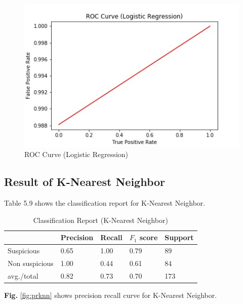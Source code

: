 \begin{figure}[h!]
    \centering
    \includegraphics[scale=0.58]{Figures/ROCL.jpg}
    \caption{ROC Curve (Logistic Regression)}
    \label{fig:rocl}
\end{figure}


\subsection{Result of K-Nearest Neighbor}
Table 5.9 shows the classification report for K-Nearest Neighbor.

\begin{table}[h!]
\begin{center}
\caption{Classification Report (K-Nearest Neighbor)}
\begin{tabular}{|m{4.4cm} | m{2cm}| m{2cm}| m{2cm}| m{2cm}|}
\hline
     & Precision & Recall & $F_1$ score & Support \\
\hline
     Suspicious & 0.65 & 1.00 & 0.79 & 89\\
\hline 
     Non suspicious  & 1.00 & 0.44 & 0.61 & 84\\
\hline 
     avg./total & 0.82 & 0.73 & 0.70 & 173\\
\hline
\end{tabular}
\end{center}
\end{table}

\noindent
\textbf{Fig.} \ref{fig:prknn} shows precision recall curve for K-Nearest Neighbor.

